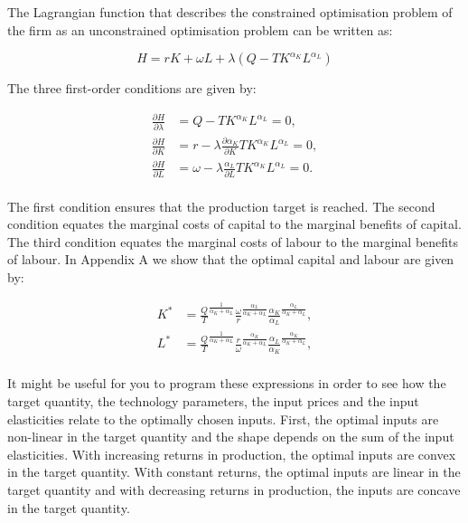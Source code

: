 \documentclass[
]{book}
\begin{document}
The Lagrangian function that describes the constrained optimisation problem of the firm as an unconstrained optimisation problem can be written as:

\begin{equation}
H = rK+\omega L + \lambda (Q - TK^{\alpha_K}L^{\alpha_L})
\end{equation}

The three first-order conditions are given by:

\begin{align}
\frac{\partial H}{\partial \lambda} &=Q - TK^{\alpha_K}L^{\alpha_L} = 0,\\
\frac{\partial H}{\partial K} &= r - \lambda\frac{\partial \alpha_K}{\partial K}TK^{\alpha_K}L^{\alpha_L}= 0,\\
\frac{\partial H}{\partial L} &= \omega - \lambda\frac{\alpha_L}{\partial L}TK^{\alpha_K}L^{\alpha_L}= 0.\\
\end{align}

The first condition ensures that the production target is reached. The second condition equates the marginal costs of capital to the marginal benefits of capital. The third condition equates the marginal costs of labour to the marginal benefits of labour. In Appendix A we show that the optimal capital and labour are given by:

\begin{align}
K^\ast &= \frac{Q}{T}^{\frac{1}{\alpha_K+\alpha_L}}\frac{\omega}{r}^{\frac{\alpha_L}{\alpha_K+\alpha_L}}\frac{\alpha_K}{\alpha_L}^{\frac{\alpha_L}{\alpha_K+\alpha_L}},\\
L^\ast &= \frac{Q}{T}^{\frac{1}{\alpha_K+\alpha_L}}\frac{r}{\omega}^{\frac{\alpha_K}{\alpha_K+\alpha_L}}\frac{\alpha_L}{\alpha_K}^{\frac{\alpha_K}{\alpha_K+\alpha_L}},\\
\end{align}

It might be useful for you to program these expressions in order to see how the target quantity, the technology parameters, the input prices and the input elasticities relate to the optimally chosen inputs. First, the optimal inputs are non-linear in the target quantity and the shape depends on the sum of the input elasticities. With increasing returns in production, the optimal inputs are convex in the target quantity. With constant returns, the optimal inputs are linear in the target quantity and with decreasing returns in production, the inputs are concave in the target quantity.
\end{document}
